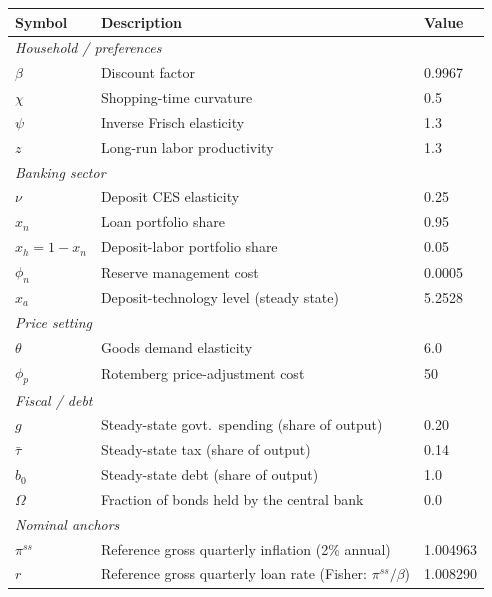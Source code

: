 \documentclass[]{article}
\begin{document}
\begin{table}[h]
\centering
\small
\setlength{\tabcolsep}{4pt}
\renewcommand{\arraystretch}{0.88}
\begin{tabular}{lll}
\toprule
Symbol & Description & Value \\
\midrule
\multicolumn{3}{l}{\textit{Household / preferences}} \\
$\beta$      & Discount factor                         & 0.9967 \\
$\chi$       & Shopping-time curvature                 & 0.5 \\
$\psi$       & Inverse Frisch elasticity                & 1.3 \\
$z$          & Long-run labor productivity              & 1.3 \\
\midrule
\multicolumn{3}{l}{\textit{Banking sector}} \\
$\nu$        & Deposit CES elasticity                   & 0.25 \\
$x_n$        & Loan portfolio share                     & 0.95 \\
$x_h=1-x_n$  & Deposit-labor portfolio share             & 0.05 \\
$\phi_n$     & Reserve management cost                  & 0.0005 \\
$x_a$        & Deposit-technology level (steady state)  & 5.2528 \\
\midrule
\multicolumn{3}{l}{\textit{Price setting}} \\
$\theta$     & Goods demand elasticity                  & 6.0 \\
$\phi_p$     & Rotemberg price-adjustment cost           & 50 \\
\midrule
\multicolumn{3}{l}{\textit{Fiscal / debt}} \\
$g$          & Steady-state govt.\ spending (share of output) & 0.20 \\
$\bar\tau$   & Steady-state tax (share of output)                 & 0.14\\
$b_0$        & Steady-state debt (share of output)                & 1.0 \\
$\Omega$     & Fraction of bonds held by the central bank & 0.0 \\
\midrule
\multicolumn{3}{l}{\textit{Nominal anchors}} \\
$\pi^{ss}$   & Reference gross quarterly inflation (2\% annual) & 1.004963 \\
$r$ & Reference gross quarterly loan rate (Fisher: $\pi^{ss}/\beta$) & 1.008290 \\

\end{tabular}
\end{table}
\end{document}
